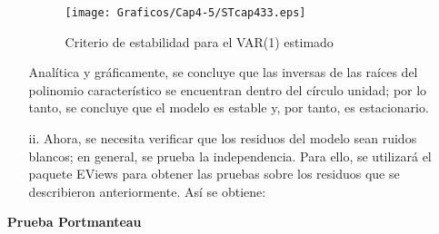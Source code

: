 \begin{enumerate}
\begin{enumerate}
\begin{figure}[H]
\centering
\texttt{[image: Graficos/Cap4-5/STcap433.eps]}
\caption{Criterio de estabilidad para el VAR(1) estimado}
\label{fig33}
\end{figure}

Anal\'{i}tica y gr\'{a}ficamente, se concluye que las inversas de las ra\'{i}ces del polinomio caracter\'{i}stico se encuentran dentro del c\'{i}rculo unidad; por lo tanto, se concluye que el modelo es estable y, por tanto, es estacionario.

      \item[ii.] Ahora, se necesita verificar que los residuos del modelo sean ruidos blancos; en general, se prueba la independencia. Para ello, se utilizar\'{a} el paquete EViews para obtener las pruebas sobre los residuos que se describieron anteriormente. As\'{i} se obtiene:
\end{enumerate}

\textbf{Prueba Portmanteau}


\end{enumerate}
